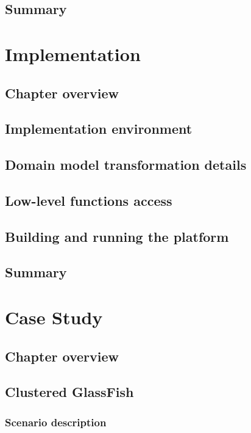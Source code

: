 \documentclass[11pt]{book}
\begin{document}
    \section*{Summary}


  \chapter{Implementation}
    
    \section*{Chapter overview}


    \section{Implementation environment}


    \section{Domain model transformation details}


    \section{Low-level functions access}


    \section{Building and running the platform}


    \section*{Summary}


  \chapter{Case Study}

    \section*{Chapter overview}

    \section{Clustered GlassFish}

      \subsection{Scenario description}
\end{document}
